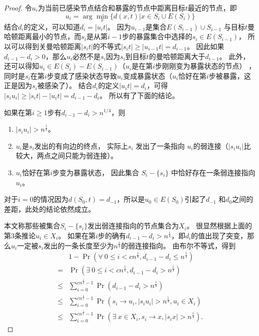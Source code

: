 \begin{proof}
令$u_{i}$为当前已感染节点结合和暴露的节点中距离目标$t$最近的节点，即
$$u_{i} = \arg\min_x \{ d(x,t) | x\in S_i \cup E(S_{i}) \}$$
结合$d_i$的定义，可以知道$d_i = |u_{i}t|$。
因为$u_{i-1}$是集合$E(S_{i-1}) \cup S_{i-1}$ 与目标$t$曼哈顿距离最小的节点，而$s_i$是从第$i-1$步的暴露集合中选择的$s_i \in E(S_{i-1})$，
所以可以得到关曼哈顿距离$|s_{i}t|$的不等式$|s_{i}t| \geq |u_{i-1}t| = d_{i-1}$。
因此如果$d_{i-1}-d_{i}> 0$，那么$u_{i}$必然不是$s_i$因为$s_i$到目标$t$的曼哈顿距离大于$d_{i-1}$。
此外，还可以得知$u_i \in E(S_i) - E(S_{i-1})$（$u_i$是在第$i$步刚刚变为暴露状态的节点）
，同时是$s_i$在第$i$步变成了感染状态导致$u_i$变成暴露状态（$u_i$恰好在第$i$步被暴露，这正是因为$s_i$被感染了）。
结合$d_i$的定义$|u_{i}t| = d_{i}$，可得$|s_{i}u_{i}| \geq |s_{i}t| - |u_{i}t| = d_{i-1}-d_{i}$。
所以有了下面的结论。

如果在第$i \geq 1$步有$d_{i-1}-d_{i}> n^{1/4}$，则
\vspace{0.2cm}
\begin{enumerate}[itemindent=2em] 
\item $|s_{i}u_{i}| > n^{\frac{1}{4}}$。
\item $u_i$是$s_i$发出的有向边的终点， 实际上$s_i$ 发出了一条指向 $u_i$的弱连接（$|s_{i}u_{i}|$比较大，两点之间只能为弱连接）。
\item $u_i$恰好在第$i$步变为暴露状态， 因此集合 $S_{i} - \{s_i\}$ 中恰好存在一条弱连接指向 $u_i$。
\end{enumerate}
对于$i=0$的情况因为$d(S_0,t) = d_{-1}$，所以是$u_0 \in E(S_0)$引起了$d_{-1}$ 和$d_0$之间的差距，此处的结论依然成立。

本文称那些被集合$S_{i} - \{s_i\}$发出弱连接指向的节点集合为$X_i$。
很显然根据上面的第3条推论$u_i \in X_i$。
如果在第$i$步的确有$d_{i-1}-d_{i}> n^{\frac{1}{4}}$，即$d_i$的值出现了突变，那么$u_i$一定被$s_i$发出的一条长度至少为$n^{\frac{1}{4}}$的弱连接指向。
由布尔不等式，得到
\begin{equation}
\begin{array}{ll}
& 1- \Pr(\forall~0 \leq i < cn^{\frac{1}{4}}, d_{i-1}-d_{i}\leq n^{\frac{1}{4}})\\
= & \Pr(\exists~0 \leq i < cn^{\frac{1}{4}}, d_{i-1}-d_{i}> n^{\frac{1}{4}}) \\
\leq & \sum_{i=0}^{cn^{\frac{1}{4}}-1}\Pr(d_{i-1}-d_{i}> n^{\frac{1}{4}}) \\
\leq & \sum_{i=0}^{cn^{\frac{1}{4}}-1}\Pr(s_i \to u_i , |s_iu_i| > n^{\frac{1}{4}} , u_i \in X_i) \\
\leq & \sum_{i=0}^{cn^{\frac{1}{4}}-1}\Pr(\exists~x \in X_i, s_i \to x, |s_ix| > n^{\frac{1}{4}}).
\end{array}
\label{eq:routing}
\end{equation}


\end{proof}

